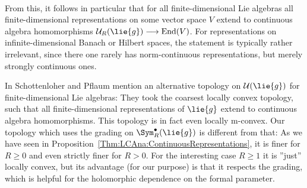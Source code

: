 \begin{remark}
    \label{Rem:LCAnaBCHConvergence}
    ~
    \begin{remarklist}
    \item \label{item:FiniteDimRepsContinuous} From this, it follows
        in particular that for all finite-dimensional Lie algebras all
        finite-dimensional representations on some vector space $V$
        extend to continuous algebra homomorphisms
        $\mathcal{U}_R(\lie{g}) \longrightarrow
        \operatorname{End}(V)$. For representations on
        infinite-dimensional Banach or Hilbert spaces, the statement
        is typically rather irrelevant, since there one rarely has
        norm-continuous representations, but merely strongly
        continuous ones.
    \item In \cite{pflaum.schottenloher:1998a} Schottenloher and
        Pflaum mention an alternative topology on
        $\mathcal{U}(\lie{g})$ for finite-dimensional Lie algebras:
        They took the coarsest locally convex topology, such that all
        finite-dimensional representations of $\lie{g}$ extend to
        continuous algebra homomorphisms. This topology is in fact
        even locally m-convex. Our topology which uses the grading on
        $\Sym_R^{\bullet}(\lie{g})$ is different from that: As we have
        seen in Proposition~\ref{Thm:LCAna:ContinuousRepresentations},
        it is finer for $R \geq 0$ and even strictly finer for $R >
        0$. For the interesting case $R \geq 1$ it is ''just'' locally
        convex, but its advantage (for our purpose) is that it
        respects the grading, which is helpful for the holomorphic
        dependence on the formal parameter. 
    \end{remarklist}
\end{remark}
